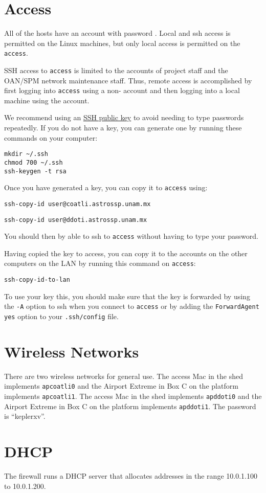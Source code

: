 \section{Access}

All of the hosts have an account {\projectaccount} with password {\projectaccount}. Local and ssh access is permitted on the Linux machines, but only local access is permitted on the \verb|access|.

SSH access to \verb|access| is limited to the accounts of project staff and the OAN/SPM network maintenance staff. Thus, remote access is accomplished by first logging into \verb|access| using a non-{\projectaccount} account and then logging into a local machine using the {\projectaccount} account.

We recommend using an \href{https://help.ubuntu.com/community/SSH/OpenSSH/Keys}{SSH public key} to avoid needing to type passwords repeatedly. If you do not have a key, you can generate one by running these commands on your computer:
\begin{verbatim}
mkdir ~/.ssh
chmod 700 ~/.ssh
ssh-keygen -t rsa
\end{verbatim}
Once you have generated a key, you can copy it to \verb|access| using:
\ifcoatli
\begin{verbatim}
ssh-copy-id user@coatli.astrossp.unam.mx
\end{verbatim}
\fi
\ifddoti
\begin{verbatim}
ssh-copy-id user@ddoti.astrossp.unam.mx
\end{verbatim}
\fi
You should then by able to ssh to \verb|access| without having to type your password.

Having copied the key to access, you can copy it to the {\projectaccount} accounts on the other computers on the LAN by running this command on \verb|access|:
\begin{verbatim}
ssh-copy-id-to-lan
\end{verbatim}
To use your key this, you should make sure that the key is forwarded by using the \verb|-A| option to ssh when you connect to \verb|access| or by adding the \verb|ForwardAgent yes| option to your \verb|.ssh/config| file.

\section{Wireless Networks}

There are two wireless networks for general use. 
\ifcoatli
The access Mac in the shed implements \verb|apcoatli0| and the Airport Extreme in Box C on the platform implements \verb|apcoatli1|. 
\fi
\ifddoti
The access Mac in the shed implements \verb|apddoti0| and the Airport Extreme in Box C on the platform implements \verb|apddoti1|. 
\fi
The password is “keplerxv”.

\section{DHCP}

The firewall runs a DHCP server that allocates addresses in the range 10.0.1.100 to 10.0.1.200.

